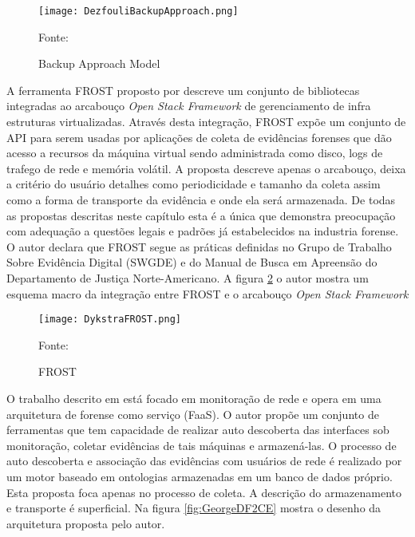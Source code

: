 \begin{figure}[htb!]
\footnotesize
\caption{Backup Approach Model}
\texttt{[image: DezfouliBackupApproach.png]}
\centering
\label{fig:DezfouliBackupApproach}
\begin{center}
Fonte: \cite{DezfouliBackupApproach:2012} 
\end{center}
\end{figure}

A ferramenta FROST proposto por \cite{DykstraFROST:2013} descreve um conjunto de bibliotecas integradas ao arcabouço \textit{Open Stack Framework} de gerenciamento de infra estruturas virtualizadas.
%
Através desta integração, FROST expõe um conjunto de API para serem usadas por aplicações de coleta de evidências forenses que dão acesso a recursos da máquina virtual sendo administrada como disco, logs de trafego de rede e memória volátil.
%
A proposta descreve apenas o arcabouço, deixa a critério do usuário detalhes como periodicidade e tamanho da coleta assim como a forma de transporte da evidência e onde ela será armazenada.
%
De todas as propostas descritas neste capítulo esta é a única que demonstra preocupação com adequação a questões legais e padrões já estabelecidos na industria forense.
%
O autor declara que FROST segue as práticas definidas no Grupo de Trabalho Sobre Evidência Digital (SWGDE) e do Manual de Busca em Apreensão do Departamento de Justiça Norte-Americano.
%
A figura \ref{fig:DykstraFROST} o autor mostra um esquema macro da integração entre FROST e o arcabouço \textit{Open Stack Framework}

\begin{figure}[htb!]
\footnotesize
\caption{FROST}
\texttt{[image: DykstraFROST.png]}
\centering
\label{fig:DykstraFROST}
\begin{center}
Fonte: \cite{DykstraFROST:2013} 
\end{center}
\end{figure}
%

O trabalho descrito em \cite{GeorgeDF2CE:2012} está focado em monitoração de rede e opera em uma arquitetura de forense como serviço (FaaS). 
%
O autor propõe um conjunto de ferramentas que tem capacidade de realizar auto descoberta das interfaces sob monitoração, coletar evidências de tais máquinas e armazená-las.
%
O processo de auto descoberta e associação das evidências com usuários de rede é realizado por um motor baseado em ontologias armazenadas em um banco de dados próprio.
%
Esta proposta foca apenas no processo de coleta. A descrição do armazenamento e transporte é superficial.
%
Na figura \ref{fig:GeorgeDF2CE} mostra o desenho da arquitetura proposta pelo autor.


